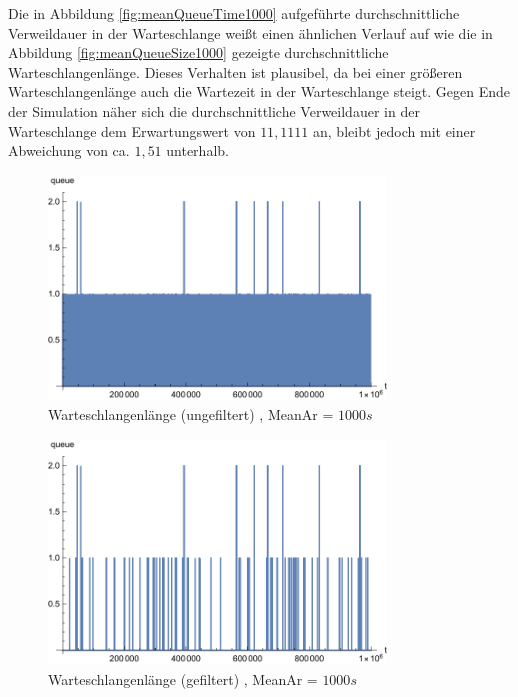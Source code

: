 Die in Abbildung \ref{fig:meanQueueTime1000} aufgeführte durchschnittliche Verweildauer in der Warteschlange weißt einen ähnlichen Verlauf auf wie die in Abbildung \ref{fig:meanQueueSize1000} gezeigte durchschnittliche Warteschlangenlänge. Dieses Verhalten ist plausibel, da bei einer größeren Warteschlangenlänge auch die Wartezeit in der Warteschlange steigt. Gegen Ende der Simulation näher sich die durchschnittliche Verweildauer in der Warteschlange dem Erwartungswert von $11,1111$ an, bleibt jedoch mit einer Abweichung von ca. $1,51$ unterhalb.

\begin{figure}[htpb]
	\centering
	\includegraphics[width=0.8\textwidth]{abbildungen/1_Phone/Arrival_1000_Serve_100_dur_1000000_Skip_0/QueueStepPlotAll.pdf}
	\caption{Warteschlangenlänge (ungefiltert) , MeanAr = $1000s$}
	\label{fig:QueueStepPlotAll1000}
\end{figure} 
\begin{figure}[htpb]
	\centering
	\includegraphics[width=0.8\textwidth]{abbildungen/1_Phone/Arrival_1000_Serve_100_dur_1000000_Skip_0/QueueStepPlotAllFiltered.pdf}
	\caption{Warteschlangenlänge (gefiltert) , MeanAr = $1000s$}
	\label{fig:QueueStepPlotAllFiltered1000}
\end{figure} 

